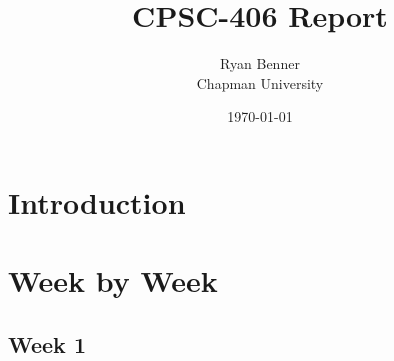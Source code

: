 \documentclass{article}
\title{CPSC-406 Report}
\author{Ryan Benner  \\ Chapman University}
\date{\today}
\theoremstyle{theorem}
\theoremstyle{definition}
\theoremstyle{remark}
\begin{document}
\maketitle

\begin{abstract}
\end{abstract}

\setcounter{tocdepth}{3}
\tableofcontents

\section{Introduction}\label{intro}

\section{Week by Week}\label{homework}

\subsection{Week 1}













\end{document}
